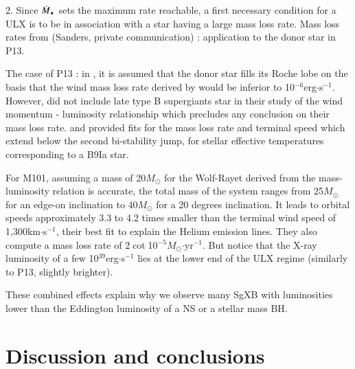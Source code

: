 \documentclass[letter]{aa}
\makeatletter
\newcommand{\sgx}{SgXB\xspace}
\newcommand{\ulx}{ULX\xspace}
\newcommand*{\ns}{NS\@\xspace}
\newcommand*{\bh}{BH\@\xspace}
\newcommand{\mystar}{{\fontfamily{lmr}\selectfont$\star$}}
\newcommand*{\msun}{$M_{\odot}$\@\xspace}
\newcommand*{\mdotstar}{$\dot{M}_{\text{\mystar}}$\@\xspace}
\makeatother
\begin{document}
2. Since \mdotstar sets the maximum rate reachable, a first necessary condition for a \ulx is to be in association with a star having a large mass loss rate. Mass loss rates from \cite{Vink2000,Vink2001} (Sanders, private communication) : application to the donor star in P13.

The case of P13 : in \cite{Motch2014}, it is assumed that the donor star fills its Roche lobe on the basis that the wind mass loss rate derived by \cite{Kudritzki1999} would be inferior to 10$^{-6}$erg$\cdot$s$^{-1}$. However, \cite{Kudritzki1999} did not include late type B supergiants star in their study of the wind momentum - luminosity relationship which precludes any conclusion on their mass loss rate. \cite{Vink2000} and \cite{Vink2001} provided fits for the mass loss rate and terminal speed which extend below the second bi-stability jump, for stellar effective temperatures corresponding to a B9Ia star. 

For M101, assuming a mass of 20\msun for the Wolf-Rayet derived from the mass-luminosity relation is accurate, the total mass of the system ranges from 25\msun for an edge-on inclination to 40\msun for a 20 degrees inclination. It leads to orbital speeds approximately 3.3 to 4.2 times smaller than the terminal wind speed of 1,300km$\cdot$s$^{-1}$, their best fit to explain the Helium emission lines. They also compute a mass loss rate of 2$\cot$10$^{-5}$\msun$\cdot$yr$^{-1}$. But notice that the X-ray luminosity of a few 10$^{39}$erg$\cdot$s$^{-1}$ lies at the lower end of the ULX regime (similarly to P13, slightly brighter).

These combined effects explain why we observe many \sgx with luminosities lower than the Eddington luminosity of a \ns or a stellar mass \bh.

\section{Discussion and conclusions}
\label{sec:}

\end{document}
